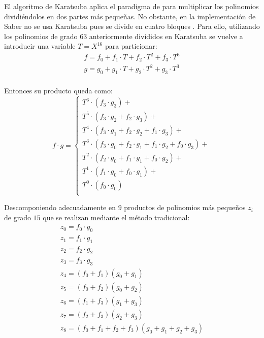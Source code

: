 El algoritmo de Karatsuba aplica el paradigma de  para multiplicar los polinomios dividiéndolos en dos partes más pequeñas. No obstante, en la implementación de Saber no se usa Karatsuba  pues se divide en cuatro bloques \cite{saber-spec-2020}. Para ello, utilizando los polinomios de grado \(63\) anteriormente divididos en Karatsuba se vuelve a introducir una variable \(T=X^{16}\) para particionar:
\begin{equation}
	\begin{array}{l}
		f=f_0+f_1\cdot T+f_2\cdot T^2+f_3\cdot T^3\\
		g=g_0+g_1\cdot T+g_2\cdot T^2+g_3\cdot T^3\\
	\end{array}
\end{equation}

Entonces su producto queda como:
\begin{equation}
	f\cdot g =\left\{ \begin{array}{l}
		T^{6}\cdot \left(f_3\cdot g_3\right)+\\
		T^{5}\cdot \left(f_3\cdot g_2+f_2\cdot g_3\right)+\\
		T^{4}\cdot \left(f_3\cdot g_1+f_2\cdot g_2+f_1\cdot g_3\right)+\\
		T^{3}\cdot \left(f_3\cdot g_0+f_2\cdot g_1+f_1\cdot g_2+f_0\cdot g_3\right)+\\
		T^{2}\cdot \left(f_2\cdot g_0+f_1\cdot g_1+f_0\cdot g_2\right)+\\
		T^{1}\cdot \left(f_1\cdot g_0+f_0\cdot g_1\right)+\\
		T^{0}\cdot\left(f_0\cdot g_0\right)\\
	\end{array}\right.
\end{equation}


Descomponiendo adecuadamente en \(9\) productos de polinomios más pequeños \(z_i\) de grado \(15\) que se realizan mediante el método tradicional:
\begin{equation}
	\begin{array}{l}
		z_0=f_0\cdot g_0\\
		z_1=f_1\cdot g_1\\
		z_2=f_2\cdot g_2\\
		z_3=f_3\cdot g_3\\
		z_4=\left(f_0+f_1\right)\left(g_0+g_1\right)\\
		z_5=\left(f_0+f_2\right)\left(g_0+g_2\right)\\
		z_6=\left(f_1+f_3\right)\left(g_1+g_3\right)\\
		z_7=\left(f_2+f_3\right)\left(g_2+g_3\right)\\
		z_8=\left(f_0+f_1+f_2+f_3\right)\left(g_0+g_1+g_2+g_3\right)\\
	\end{array}
	\label{eq:kar_decom}
\end{equation}

